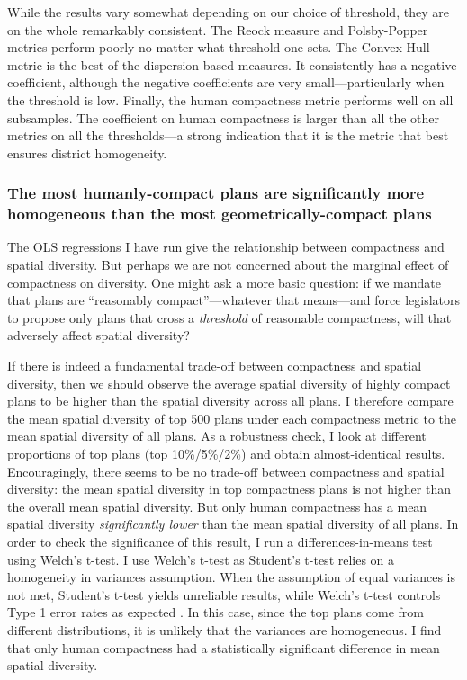 \documentclass[]{article}
\begin{document}
While the results vary somewhat depending on our choice of threshold,
they are on the whole remarkably consistent. The Reock measure and
Polsby-Popper metrics perform poorly no matter what threshold one sets.
The Convex Hull metric is the best of the dispersion-based measures. It
consistently has a negative coefficient, although the negative
coefficients are very small---particularly when the threshold is low.
Finally, the human compactness metric performs well on all subsamples.
The coefficient on human compactness is larger than all the other
metrics on all the thresholds---a strong indication that it is the
metric that best ensures district homogeneity.

\hypertarget{the-most-humanly-compact-plans-are-significantly-more-homogeneous-than-the-most-geometrically-compact-plans}{%
\subsubsection{The most humanly-compact plans are significantly more
homogeneous than the most geometrically-compact
plans}\label{the-most-humanly-compact-plans-are-significantly-more-homogeneous-than-the-most-geometrically-compact-plans}}

The OLS regressions I have run give the relationship between compactness
and spatial diversity. But perhaps we are not concerned about the
marginal effect of compactness on diversity. One might ask a more basic
question: if we mandate that plans are ``reasonably compact''---whatever
that means---and force legislators to propose only plans that cross a
\emph{threshold} of reasonable compactness, will that adversely affect
spatial diversity?

If there is indeed a fundamental trade-off between compactness and
spatial diversity, then we should observe the average spatial diversity
of highly compact plans to be higher than the spatial diversity across
all plans. I therefore compare the mean spatial diversity of top 500
plans under each compactness metric to the mean spatial diversity of all
plans. As a robustness check, I look at different proportions of top
plans (top 10\%/5\%/2\%) and obtain almost-identical results.
Encouragingly, there seems to be no trade-off between compactness and
spatial diversity: the mean spatial diversity in top compactness plans
is not higher than the overall mean spatial diversity. But only human
compactness has a mean spatial diversity \emph{significantly lower} than
the mean spatial diversity of all plans. In order to check the
significance of this result, I run a differences-in-means test using
Welch's t-test. I use Welch's t-test as Student's t-test relies on a
homogeneity in variances assumption. When the assumption of equal
variances is not met, Student's t-test yields unreliable results, while
Welch's t-test controls Type 1 error rates as expected
\citep{delacre2017}. In this case, since the top plans come from
different distributions, it is unlikely that the variances are
homogeneous. I find that only human compactness had a statistically
significant difference in mean spatial diversity.
\end{document}
